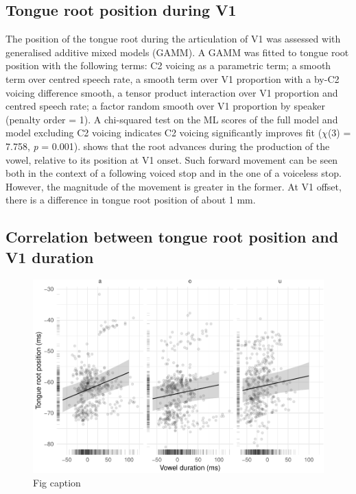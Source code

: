\documentclass[12pt,]{article}
\begin{document}
\hypertarget{tongue-root-position-during-v1}{%
\subsection{Tongue root position during
V1}\label{tongue-root-position-during-v1}}

The position of the tongue root during the articulation of V1 was
assessed with generalised additive mixed models (GAMM). A GAMM was
fitted to tongue root position with the following terms: C2 voicing as a
parametric term; a smooth term over centred speech rate, a smooth term
over V1 proportion with a by-C2 voicing difference smooth, a tensor
product interaction over V1 proportion and centred speech rate; a factor
random smooth over V1 proportion by speaker (penalty order = 1). A
chi-squared test on the ML scores of the full model and model excluding
C2 voicing indicates C2 voicing significantly improves fit (\(\chi\)(3)
= 7.758, \emph{p} = 0.001).  shows that the root
advances during the production of the vowel, relative to its position at
V1 onset. Such forward movement can be seen both in the context of a
following voiced stop and in the one of a voiceless stop. However, the
magnitude of the movement is greater in the former. At V1 offset, there
is a difference in tongue root position of about 1 mm.

\hypertarget{correlation-between-tongue-root-position-and-v1-duration}{%
\subsection{Correlation between tongue root position and V1
duration}\label{correlation-between-tongue-root-position-and-v1-duration}}

\begin{figure}
\includegraphics[width=\linewidth]{2018-tra_files/figure-latex/tra-lm-2-plot-1} \caption{Fig caption}\label{f:tra-lm-2-plot}
\end{figure}
\end{document}
